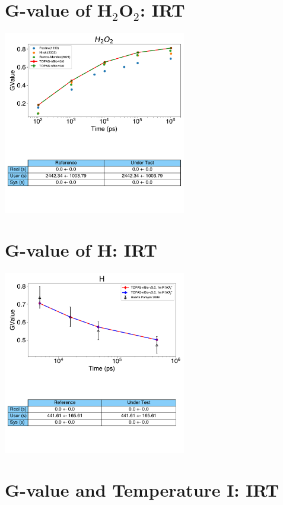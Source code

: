 \documentclass[aspectratio=1610]{beamer}
\begin{document}
\section{G-value of H$_2$O$_2$: IRT}

\begin{frame}{\secname}
 \centering
  \includegraphics[width=0.6\textwidth]{./GvalueIRT_H2O2/TimeEvolution}
\end{frame}

\section{G-value of H: IRT}

\begin{frame}{\secname}
 \centering
  \includegraphics[width=0.6\textwidth]{./GvalueIRT_H/TimeEvolution}
\end{frame}


\section{G-value and Temperature I: IRT}
\end{document}
